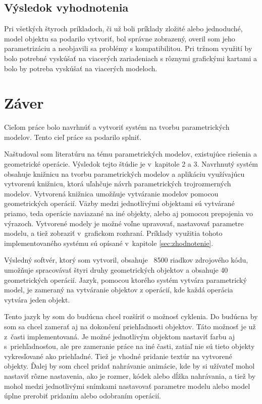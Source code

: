 \section*{Výsledok vyhodnotenia}
Pri všetkých štyroch príkladoch, či už boli príklady zložité alebo jednoduché, model objektu sa podarilo vytvoriť, bol správne zobrazený, overil som jeho parametrizáciu a neobjavili sa problémy s kompatibilitou. Pri tržnom využití by bolo potrebné vyskúšať na viacerých zariadeniach s rôznymi grafickými kartami a bolo by potreba vyskúšať na viacerých modeloch.





\chapter{Záver}
Cieľom práce bolo navrhnúť a vytvoriť systém na tvorbu parametrických modelov. Tento cieľ práce sa podarilo splniť. 


Naštudoval som literatúru na tému parametrických modelov, existujúce riešenia a geometrické operácie. Výsledok tejto štúdie je v~kapitole 2 a 3. 
Navrhnutý systém obsahuje knižnicu na tvorbu parametrických modelov a aplikáciu využívajúcu vytvorenú knižnicu, ktorá uľahčuje návrh parametrických trojrozmerných modelov.
Vytvorená knižnica umožňuje vytváranie modelov pomocou geometrických operácií. Väzby medzi jednotlivými objektami sú vytvárané  priamo, teda operácie naviazané na iné objekty, alebo aj pomocou prepojenia vo výrazoch. Vytvorené modely je možné voľne upravovať, nastavovať parametre modelu, a tiež zobraziť v~grafickom rozhraní. Príklady využitia tohoto implementovaného systému sú opísané v~kapitole \ref{sec:zhodnotenie}.

Výsledný softvér, ktorý som vytvoril, obsahuje ~8500 riadkov zdrojového kódu, umožňuje spracovávať štyri druhy geometrických objektov a obsahuje 40 geometrických operácií. Jazyk, pomocou ktorého systém vytvára parametrický model, je zameraný na vytváranie objektov z operácií, kde každá operácia vytvára jeden objekt. 

Tento jazyk by som do budúcna chcel rozšíriť o možnosť cyklenia.
Do budúcna by som sa chcel zamerať aj na dokončení priehľadnosti objektov. Táto možnosť je už z~časti implementovaná. Je možné jednotlivým objektom nastaviť farbu aj s~priehľadnosťou, ale pre zameranie práce na iné časti, zatiaľ nie sú tieto objekty vykresľované ako priehľadné.
Tiež je vhodné pridanie textúr na vytvorené objekty.
Ďalej by som chcel pridať nahrávanie animácie, kde by si užívateľ mohol nastaviť rôzne nastavenia, ako je rozmer, kódek alebo dĺžka nahrávania, a tiež by mohol medzi jednotlivými snímkami nastavovať parametre modelu alebo model úplne prerobiť pridaním alebo odobraním operácií.  

